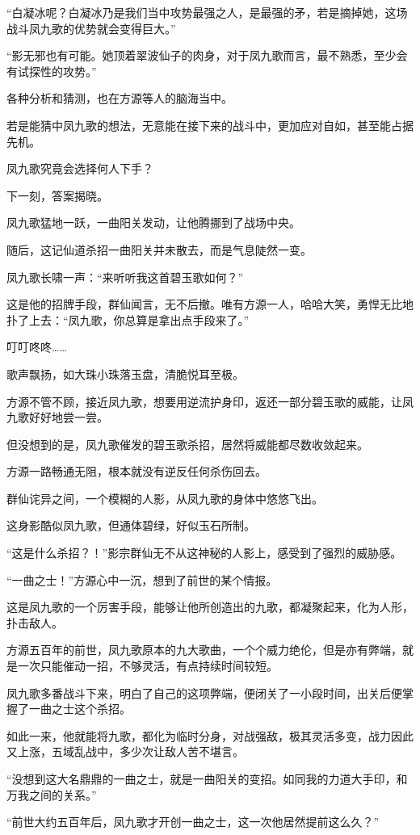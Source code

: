 \begin{this_body}
“白凝冰呢？白凝冰乃是我们当中攻势最强之人，是最强的矛，若是摘掉她，这场战斗凤九歌的优势就会变得巨大。”

“影无邪也有可能。她顶着翠波仙子的肉身，对于凤九歌而言，最不熟悉，至少会有试探性的攻势。”

各种分析和猜测，也在方源等人的脑海当中。

若是能猜中凤九歌的想法，无意能在接下来的战斗中，更加应对自如，甚至能占据先机。

凤九歌究竟会选择何人下手？

下一刻，答案揭晓。

凤九歌猛地一跃，一曲阳关发动，让他腾挪到了战场中央。

随后，这记仙道杀招一曲阳关并未散去，而是气息陡然一变。

凤九歌长啸一声：“来听听我这首碧玉歌如何？”

这是他的招牌手段，群仙闻言，无不后撤。唯有方源一人，哈哈大笑，勇悍无比地扑了上去：“凤九歌，你总算是拿出点手段来了。”

叮叮咚咚……

歌声飘扬，如大珠小珠落玉盘，清脆悦耳至极。

方源不管不顾，接近凤九歌，想要用逆流护身印，返还一部分碧玉歌的威能，让凤九歌好好地尝一尝。

但没想到的是，凤九歌催发的碧玉歌杀招，居然将威能都尽数收敛起来。

方源一路畅通无阻，根本就没有逆反任何杀伤回去。

群仙诧异之间，一个模糊的人影，从凤九歌的身体中悠悠飞出。

这身影酷似凤九歌，但通体碧绿，好似玉石所制。

“这是什么杀招？！”影宗群仙无不从这神秘的人影上，感受到了强烈的威胁感。

“一曲之士！”方源心中一沉，想到了前世的某个情报。

这是凤九歌的一个厉害手段，能够让他所创造出的九歌，都凝聚起来，化为人形，扑击敌人。

方源五百年的前世，凤九歌原本的九大歌曲，一个个威力绝伦，但是亦有弊端，就是一次只能催动一招，不够灵活，有点持续时间较短。

凤九歌多番战斗下来，明白了自己的这项弊端，便闭关了一小段时间，出关后便掌握了一曲之士这个杀招。

如此一来，他就能将九歌，都化为临时分身，对战强敌，极其灵活多变，战力因此又上涨，五域乱战中，多少次让敌人苦不堪言。

“没想到这大名鼎鼎的一曲之士，就是一曲阳关的变招。如同我的力道大手印，和万我之间的关系。”

“前世大约五百年后，凤九歌才开创一曲之士，这一次他居然提前这么久？”


\end{this_body}
